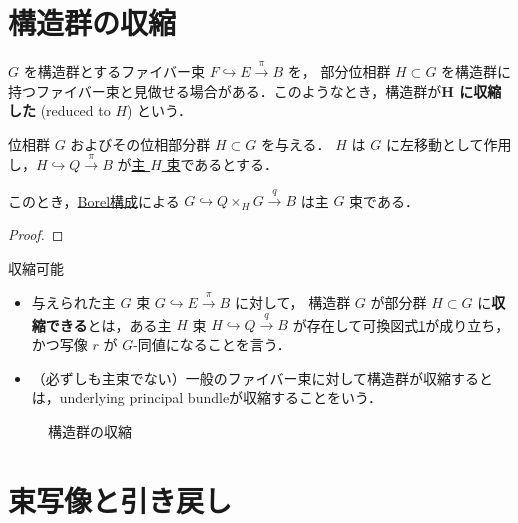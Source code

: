 \documentclass[algtopo_main]{subfiles}
\begin{document}
\section{構造群の収縮}

$G$ を構造群とするファイバー束 $F \hookrightarrow E \xrightarrow{\pi} B$ を，
部分位相群 $H \subset G$ を構造群に持つファイバー束と見做せる場合がある．このようなとき，構造群が\textbf{$\bm{H}$ に収縮した} (reduced to $H$) という．

\begin{myprop}[]{}
    位相群 $G$ およびその位相部分群 $H \subset G$ を与える．
    $H$ は $G$ に左移動として作用し，$H \hookrightarrow Q \xrightarrow{\pi} B$ が\hyperref[def:GB]{主 $H$ 束}であるとする．

    このとき，\hyperref[prop:Borel-const]{Borel構成}による $G \hookrightarrow Q \times_H G \xrightarrow{q} B$ は主 $G$ 束である．
\end{myprop}

\begin{proof}
    
\end{proof}

\begin{mydef}[label=def:reducible]{収縮可能}
    \begin{itemize}
        \item 与えられた主 $G$ 束 $G \hookrightarrow E \xrightarrow{\pi} B$ に対して，
        構造群 $G$ が部分群 $H \subset G$ に\textbf{収縮できる}とは，ある主 $H$ 束 $H \hookrightarrow Q \xrightarrow{q} B$ が存在して可換図式\ref{cmtd:reduce}が成り立ち，かつ写像 $r$ が $G$-同値になることを言う．
        \item （必ずしも主束でない）一般のファイバー束に対して構造群が収縮するとは，underlying principal bundleが収縮することをいう．
    \end{itemize}
\end{mydef}

\begin{figure}[H]
    \centering
    \caption{構造群の収縮}
    \label{cmtd:reduce}
\end{figure}%

\section{束写像と引き戻し}
\end{document}

